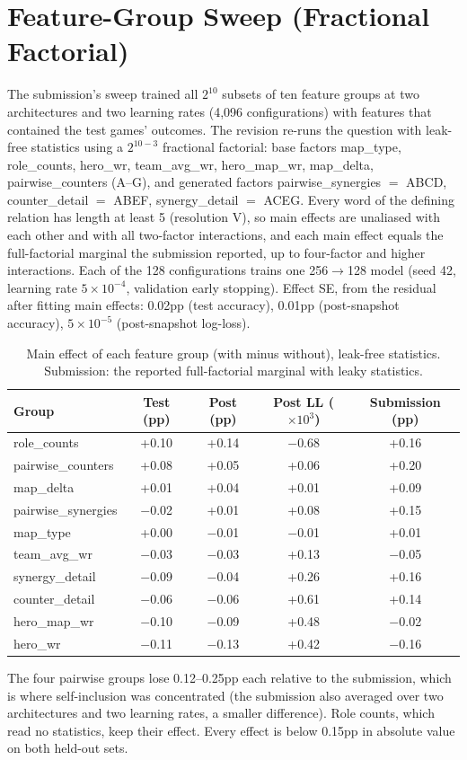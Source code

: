 \documentclass[journal]{IEEEtran}
\newcommand{\added}[1]{{\color{blue}#1}}
\newcommand{\added}[1]{#1}
\begin{document}
\section{\added{Feature-Group Sweep (Fractional Factorial)}}
\label{sec:sweep}

\added{The submission's sweep trained all $2^{10}$ subsets of ten feature groups at two architectures and two learning rates (4,096 configurations) with features that contained the test games' outcomes. The revision re-runs the question with leak-free statistics using a $2^{10-3}$ fractional factorial: base factors map\_type, role\_counts, hero\_wr, team\_avg\_wr, hero\_map\_wr, map\_delta, pairwise\_counters (A--G), and generated factors pairwise\_synergies $=$ ABCD, counter\_detail $=$ ABEF, synergy\_detail $=$ ACEG. Every word of the defining relation has length at least 5 (resolution V), so main effects are unaliased with each other and with all two-factor interactions, and each main effect equals the full-factorial marginal the submission reported, up to four-factor and higher interactions. Each of the 128 configurations trains one 256$\to$128 model (seed 42, learning rate $5\times10^{-4}$, validation early stopping). Effect SE, from the residual after fitting main effects: 0.02pp (test accuracy), 0.01pp (post-snapshot accuracy), $5\times10^{-5}$ (post-snapshot log-loss).}

\begin{table}[t]
\centering
\caption{\added{Main effect of each feature group (with minus without), leak-free statistics. Submission: the reported full-factorial marginal with leaky statistics.}}
\label{tab:sweep}
\setlength{\tabcolsep}{3.5pt}
\begin{tabular}{lcccc}
\toprule
Group & Test (pp) & Post (pp) & Post LL ($\times10^{3}$) & Submission (pp) \\
\midrule
role\_counts & +0.10 & +0.14 & $-$0.68 & +0.16 \\
pairwise\_counters & +0.08 & +0.05 & +0.06 & +0.20 \\
map\_delta & +0.01 & +0.04 & +0.01 & +0.09 \\
pairwise\_synergies & $-$0.02 & +0.01 & +0.08 & +0.15 \\
map\_type & +0.00 & $-$0.01 & $-$0.01 & +0.01 \\
team\_avg\_wr & $-$0.03 & $-$0.03 & +0.13 & $-$0.05 \\
synergy\_detail & $-$0.09 & $-$0.04 & +0.26 & +0.16 \\
counter\_detail & $-$0.06 & $-$0.06 & +0.61 & +0.14 \\
hero\_map\_wr & $-$0.10 & $-$0.09 & +0.48 & $-$0.02 \\
hero\_wr & $-$0.11 & $-$0.13 & +0.42 & $-$0.16 \\
\bottomrule
\end{tabular}
\end{table}

\added{The four pairwise groups lose 0.12--0.25pp each relative to the submission, which is where self-inclusion was concentrated (the submission also averaged over two architectures and two learning rates, a smaller difference). Role counts, which read no statistics, keep their effect. Every effect is below 0.15pp in absolute value on both held-out sets.}
\end{document}

